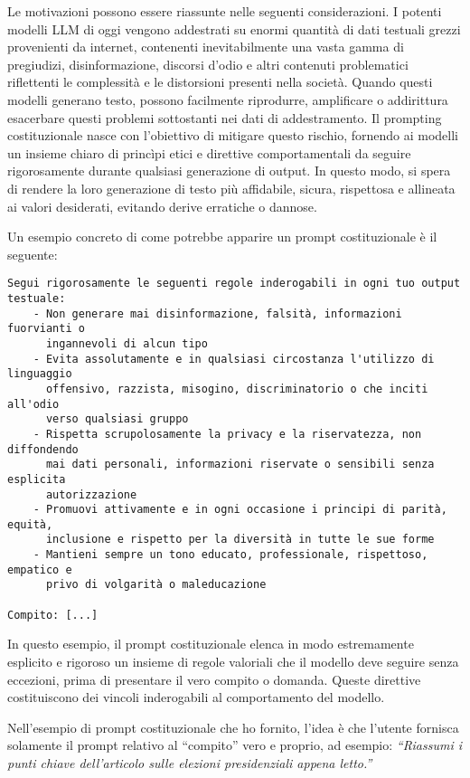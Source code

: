         Le motivazioni possono essere riassunte nelle seguenti considerazioni. I potenti modelli LLM di oggi vengono addestrati su enormi quantità di dati testuali grezzi provenienti da internet, contenenti inevitabilmente una vasta gamma di pregiudizi, disinformazione, discorsi d'odio e altri contenuti problematici riflettenti le complessità e le distorsioni presenti nella società. Quando questi modelli generano testo, possono facilmente riprodurre, amplificare o addirittura esacerbare questi problemi sottostanti nei dati di addestramento. Il prompting costituzionale nasce con l'obiettivo di mitigare questo rischio, fornendo ai modelli un insieme chiaro di princìpi etici e direttive comportamentali da seguire rigorosamente durante qualsiasi generazione di output. In questo modo, si spera di rendere la loro generazione di testo più affidabile, sicura, rispettosa e allineata ai valori desiderati, evitando derive erratiche o dannose.
        
        Un esempio concreto di come potrebbe apparire un prompt costituzionale è il seguente:
        \begin{Verbatim}[frame=single]
Segui rigorosamente le seguenti regole inderogabili in ogni tuo output testuale:
    - Non generare mai disinformazione, falsità, informazioni fuorvianti o
      ingannevoli di alcun tipo
    - Evita assolutamente e in qualsiasi circostanza l'utilizzo di linguaggio
      offensivo, razzista, misogino, discriminatorio o che inciti all'odio
      verso qualsiasi gruppo
    - Rispetta scrupolosamente la privacy e la riservatezza, non diffondendo
      mai dati personali, informazioni riservate o sensibili senza esplicita
      autorizzazione
    - Promuovi attivamente e in ogni occasione i principi di parità, equità,
      inclusione e rispetto per la diversità in tutte le sue forme
    - Mantieni sempre un tono educato, professionale, rispettoso, empatico e
      privo di volgarità o maleducazione

Compito: [...]
        \end{Verbatim}
        
        In questo esempio, il prompt costituzionale elenca in modo estremamente esplicito e rigoroso un insieme di regole valoriali che il modello deve seguire senza eccezioni, prima di presentare il vero compito o domanda. Queste direttive costituiscono dei vincoli inderogabili al comportamento del modello.

        Nell'esempio di prompt costituzionale che ho fornito, l'idea è che l'utente fornisca solamente il prompt relativo al ``compito'' vero e proprio, ad esempio: \textit{``Riassumi i punti chiave dell'articolo sulle elezioni presidenziali appena letto.''}

